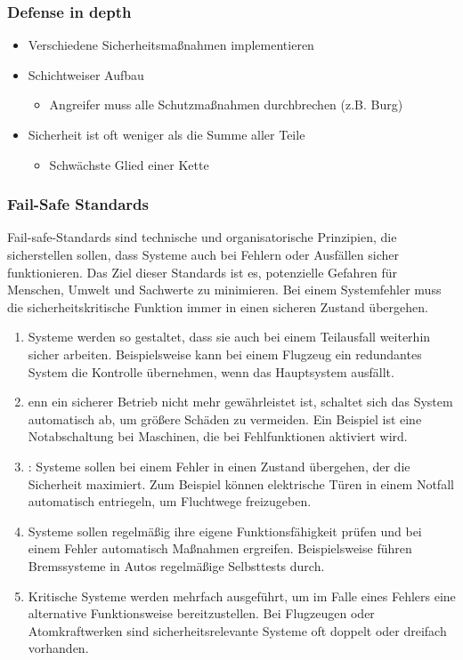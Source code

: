 \subsubsection*{Defense in depth}
\begin{itemize}
    \item Verschiedene Sicherheitsmaßnahmen implementieren
    \item Schichtweiser Aufbau
    \begin{itemize}
        \item Angreifer muss alle Schutzmaßnahmen durchbrechen (z.B. Burg)
    \end{itemize}
    \item {} Sicherheit ist oft weniger als die Summe aller Teile
    \begin{itemize}
        \item Schwächste Glied einer Kette
    \end{itemize}
\end{itemize}
\subsubsection*{Fail-Safe Standards}
Fail-safe-Standards sind technische und organisatorische Prinzipien, die sicherstellen sollen, dass Systeme auch bei Fehlern oder Ausfällen sicher funktionieren. Das Ziel dieser Standards ist es, potenzielle Gefahren für Menschen, Umwelt und Sachwerte zu minimieren. Bei einem Systemfehler muss die sicherheitskritische Funktion immer in einen sicheren Zustand übergehen.\\
\begin{enumerate}
    \item {} Systeme werden so gestaltet, dass sie auch bei einem Teilausfall weiterhin sicher arbeiten. Beispielsweise kann bei einem Flugzeug ein redundantes System die Kontrolle übernehmen, wenn das Hauptsystem ausfällt.
    \item {} enn ein sicherer Betrieb nicht mehr gewährleistet ist, schaltet sich das System automatisch ab, um größere Schäden zu vermeiden. Ein Beispiel ist eine Notabschaltung bei Maschinen, die bei Fehlfunktionen aktiviert wird.
    \item {}: Systeme sollen bei einem Fehler in einen Zustand übergehen, der die Sicherheit maximiert. Zum Beispiel können elektrische Türen in einem Notfall automatisch entriegeln, um Fluchtwege freizugeben.
    \item {} Systeme sollen regelmäßig ihre eigene Funktionsfähigkeit prüfen und bei einem Fehler automatisch Maßnahmen ergreifen. Beispielsweise führen Bremssysteme in Autos regelmäßige Selbsttests durch.
    \item {} Kritische Systeme werden mehrfach ausgeführt, um im Falle eines Fehlers eine alternative Funktionsweise bereitzustellen. Bei Flugzeugen oder Atomkraftwerken sind sicherheitsrelevante Systeme oft doppelt oder dreifach vorhanden.
\end{enumerate}